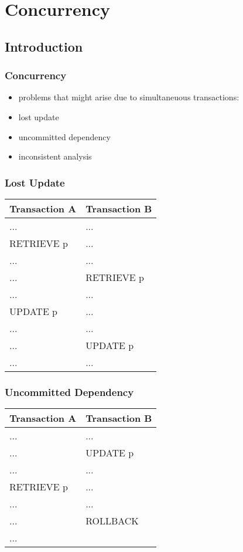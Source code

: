 \documentclass[dvipsnames]{beamer}
\theoremstyle{plain}
\begin{document}
\section{Concurrency}

\subsection{Introduction}

\begin{frame}
  \frametitle{Concurrency}

  \begin{itemize}
    \item problems that might arise due to simultaneuous transactions:

    \bigskip
    \item lost update
    \item uncommitted dependency
    \item inconsistent analysis
  \end{itemize}
\end{frame}

\begin{frame}[fragile]
  \frametitle{Lost Update}

  \begin{table}
    \begin{tabular}{ll}
Transaction A & Transaction B\\\hline
...           & ...          \\\pause
RETRIEVE p    & ...          \\\pause
...           & ...          \\
...           & RETRIEVE p   \\\pause
...           & ...          \\
UPDATE p      & ...          \\\pause
...           & ...          \\
...           & UPDATE p     \\
...           & ...
    \end{tabular}
  \end{table}
\end{frame}

\begin{frame}[fragile]
  \frametitle{Uncommitted Dependency}

  \begin{table}
    \begin{tabular}{ll}
Transaction A & Transaction B\\\hline
...           & ...          \\\pause
...           & UPDATE p     \\\pause
...           & ...          \\
RETRIEVE p    & ...          \\\pause
...           & ...          \\
...           & ROLLBACK     \\
...           &
    \end{tabular}
  \end{table}
\end{frame}
\end{document}
